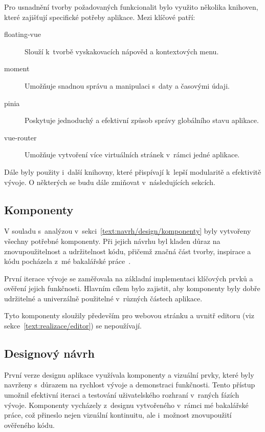 Pro usnadnění tvorby požadovaných funkcionalit bylo využito několika knihoven, které zajišťují specifické potřeby aplikace. 
Mezi klíčové patří:

\begin{description}
    \item[floating-vue] Slouží k~tvorbě vyskakovacích nápověd a kontextových menu.
    \item[moment] Umožňuje snadnou správu a manipulaci s~daty a časovými údaji.
    \item[pinia] Poskytuje jednoduchý a efektivní způsob správy globálního stavu aplikace.
    \item[vue-router] Umožňuje vytvoření více virtuálních stránek v~rámci jedné aplikace.
\end{description}

Dále byly použity i~další knihovny, které přispívají k~lepší modularitě a efektivitě vývoje.
O některých se budu dále zmiňovat v~následujících sekcích.

\subsection{Komponenty}

V souladu s~analýzou v~sekci~\ref{text:navrh/design/komponenty} byly vytvořeny všechny potřebné komponenty. 
Při jejich návrhu byl kladen důraz na znovupoužitelnost a udržitelnost kódu, přičemž značná část tvorby, inspirace a kódu pocházela z~mé bakalářské práce~\cite{cajthaml_bp}.

První iterace vývoje se zaměřovala na základní implementaci klíčových prvků a ověření jejich funkčnosti. 
Hlavním cílem bylo zajistit, aby komponenty byly dobře udržitelné a univerzálně použitelné v~různých částech aplikace.

Tyto komponenty sloužily především pro webovou stránku a uvnitř editoru (viz sekce~\ref{text:realizace/editor}) se nepoužívají.

\subsection{Designový návrh}

První verze designu aplikace využívala komponenty a vizuální prvky, které byly navrženy s~důrazem na rychlost vývoje a demonstraci funkčnosti. 
Tento přístup umožnil efektivní iteraci a testování uživatelského rozhraní v~raných fázích vývoje.
Komponenty vycházely z~designu vytvořeného v~rámci mé bakalářské práce, což přineslo nejen vizuální kontinuitu, ale i~možnost znovupoužití ověřeného kódu.

